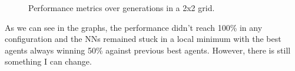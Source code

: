\documentclass[11pt]{report}
\begin{document}
\begin{enumerate}
\begin{figure}[H]
\begin{adjustbox}{valign=c,margin=-2cm 0pt 0pt 0pt}
\begin{minipage}{1.1\textwidth}
\begin{subfigure}[b]{0.45\textwidth}
                \end{subfigure}


            \end{minipage}
        \end{adjustbox}
        \caption{Performance metrics over generations in a 2x2 grid.}
        \label{fig:performances-2}


    \end{figure}
    As we can see in the graphs, the performance didn't reach 100\% in any configuration and the NNs remained stuck in a local minimum with the best agents always winning 50\% against previous best agents.
    However, there is still something I can change.


\end{enumerate}
\end{document}
